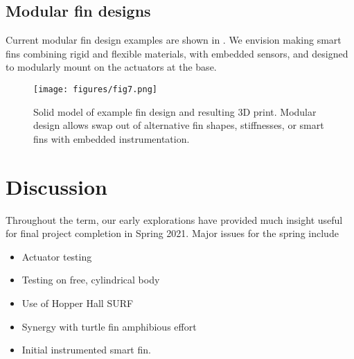 \documentclass[twocolumn,10pt]{IEEEtran}
\begin{document}
\subsection{Modular fin designs}
Current modular fin design examples are shown in . We envision making smart fins combining rigid and flexible materials, with embedded sensors, and designed to modularly mount on the actuators at the base. 
\begin{figure}
\begin{center}
\texttt{[image: figures/fig7.png]}
\end{center}
\caption{Solid model of example fin design and resulting 3D print. Modular design allows swap out of alternative fin shapes, stiffnesses, or smart fins with embedded instrumentation.}
\label{fig:findesigns}
\end{figure}








\section{Discussion}
Throughout the term, our early explorations have provided much insight useful for final project completion in Spring 2021. Major issues for the spring include
\begin{itemize}
\item Actuator testing
\item Testing on free, cylindrical body
\item Use of Hopper Hall SURF
\item Synergy with turtle fin amphibious effort
\item Initial instrumented smart fin.
\end{itemize}
\end{document}

